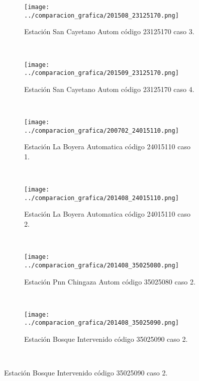 \begin{figure}[H]
\centering
\begin{subfigure}[normla]{0.4\textwidth}
\caption{Estación San Cayetano Autom  código 23125170 caso 3.}
\texttt{[image: ../comparacion\_grafica/201508\_23125170.png]}
\end{subfigure}
~
\begin{subfigure}[normla]{0.4\textwidth}
\caption{Estación San Cayetano Autom  código 23125170 caso 4.}
\texttt{[image: ../comparacion\_grafica/201509\_23125170.png]}
\end{subfigure}
~
\begin{subfigure}[normla]{0.4\textwidth}
\caption{Estación La Boyera Automatica código 24015110 caso 1.}
\texttt{[image: ../comparacion\_grafica/200702\_24015110.png]}
\end{subfigure}
~
\begin{subfigure}[normla]{0.4\textwidth}
\caption{Estación La Boyera Automatica código 24015110 caso 2.}
\texttt{[image: ../comparacion\_grafica/201408\_24015110.png]}
\end{subfigure}
~
\begin{subfigure}[normla]{0.4\textwidth}
\caption{Estación Pnn Chingaza Autom  código 35025080 caso 2.}
\texttt{[image: ../comparacion\_grafica/201408\_35025080.png]}
\end{subfigure}
~
\begin{subfigure}[normla]{0.4\textwidth}
\caption{Estación Bosque Intervenido   código 35025090 caso 2.}
\texttt{[image: ../comparacion\_grafica/201408\_35025090.png]}
\end{subfigure}
~
\end{figure}
           
